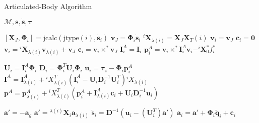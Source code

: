 \clearpage
\begin{algorithm}[h]
    \caption{Articulated-Body Algorithm}
    \label{alg:aba}
    \begin{algorithmic}[1]
        \Require $\mathcal{M}, \mathbf{s}, \dot{\mathbf{s}}, \boldsymbol{\tau}$

        \State $[\mathbf{X}_J, \boldsymbol{\Phi}_i] = \text{jcalc}(\text{jtype}(i), \dot{\mathbf{s}}_i)$
        \State $\mathrm{\mathbf{v}}_J = \boldsymbol{\Phi}_i \dot{\mathbf{s}}_i$
        \State $^i\mathbf{X}_{\lambda(i)} = \mathbf{X}_J\mathbf{X}_T (i)$
        \State $\mathrm{\mathbf{v}}_i = \mathrm{\mathbf{v}}_J$
        \State $\mathbf{c}_i = \mathbf{0}$
        \Else
        \State $\mathrm{\mathbf{v}}_i = {}^i\mathbf{X} _{\lambda(i)}\mathrm{\mathbf{v}}_{\lambda(i)} + \mathrm{\mathbf{v}}_J$
        \State $\mathbf{c}_i = \mathrm{\mathbf{v}}_i \times ^* \mathrm{\mathbf{v}}_J$
        \EndIf
        \State $\mathbf{I}_i ^A = \mathbf{I}_i$
        \State $\mathbf{p}_i ^A = \mathrm{\mathbf{v}}_i \times^* \mathbf{I}_i ^A \mathrm{\mathbf{v}}_i - ^i\mathbf{X} _0 ^* f ^* _i $
        \EndFor

        \State $\mathbf{U}_i = \mathbf{I}_i ^A \boldsymbol{\Phi}_i$
        \State $\mathbf{D} _i = \boldsymbol{\Phi} ^T _i  {} \mathbf{U} _i \boldsymbol{\Phi} _i $
        \State $\mathbf{u}_i = \boldsymbol{\tau}_i - \boldsymbol{\Phi}_i\mathbf{p}_i^A$
        \State $\mathbf{I} ^A = \mathbf{I} ^A _{\lambda (i)} + {} ^i X _{\lambda (i)} ^T (\mathbf{I} _i ^A - {}  \mathbf{U} _i  \mathbf{D} ^{-1} _i  {}  \mathbf{U} ^T _i) {} ^i X _{\lambda (i)} $
        \State $\mathbf{p} ^A = \mathbf{p} ^A _{\lambda (i)} + {} ^i X _{\lambda (i)} ^T (\mathbf{p} ^A_i + \mathbf{I} ^A _{\lambda (i)}  \mathbf{c}_i + {}  \mathbf{U} _i \mathbf{D} ^{-1} _i {} \mathbf{u} _i) $
        \EndIf
        \EndFor

        \State $\mathbf{a}' = -\mathbf{a}_g$
        \Else
        \State $\mathbf{a}' = {}^{\lambda(i)}\mathbf{X}_i \mathbf{a}_{\lambda(i)}$
        \State $\ddot{\mathbf{s}}_i = \mathbf{D}^{-1} (\mathbf{u}_i - (\mathbf{U}_i^T)\mathbf{a}')$
        \State $\mathbf{a}_i = \mathbf{a}' + \boldsymbol{\Phi}_i\mathbf{\ddot{q}}_i + \mathbf{c} _i$
        \EndIf
        \EndFor
    \end{algorithmic}
\end{algorithm}